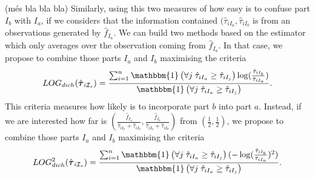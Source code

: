 \documentclass[10pt, a4paper]{article}
\newcommand{\m}[1]{\boldsymbol{#1}}
\begin{document}
{\color{red} (més bla bla bla)} Similarly, using this two measures of how easy is to confuse part $I_b$ with $I_a$, if we considers that the information contained $(\hat{\tau}_{iI_a}, \hat{\tau}_{iI_b}$ is from an observations generated by $\hat{f}_{I_a}$. We can build two methods based on the estimator which only averages over the observation coming from $\hat{f}_{I_a}$. In that case, we propose to combine those parts $I_a$ and $I_b$ maximising the criteria
\[
LOG_{dich}( \hat{\m \tau}_{i \mathcal{I}_s} ) = \frac{ \sum_{i=1}^n  \mathbbm{1}\left( \forall j\; \hat{\tau}_{i I_{a}} \geq \hat{\tau}_{iI_j} \right) \log (\frac{ \hat{\tau}_{iI_b} }{ \hat{\tau}_{iI_a} })}{\mathbbm{1}\left( \forall j\; \hat{\tau}_{i I_{a}} \geq \hat{\tau}_{iI_j} \right)}.
\]
This criteria measures how likely is to incorporate part $b$ into part $a$. Instead, if we are interested how far is $(\frac{\hat{f}_{I_a}}{\hat{\tau}_{iI_a} + \hat{\tau}_{iI_b}}, \frac{\hat{f}_{I_b}}{\hat{\tau}_{iI_a} + \hat{\tau}_{iI_b}})$ from $(\frac{1}{2}, \frac{1}{2})$, we propose to combine those parts $I_a$ and $I_b$ maximising the criteria
\[
LOG^2_{dich}( \hat{\m \tau}_{i \mathcal{I}_s} ) = \frac{ \sum_{i=1}^n \mathbbm{1}\left( \forall j\; \hat{\tau}_{i I_{a}} \geq \hat{\tau}_{iI_j} \right) (-\log (\frac{ \hat{\tau}_{iI_b} }{ \hat{\tau}_{iI_a} })^2)}{\mathbbm{1}\left( \forall j\; \hat{\tau}_{i I_{a}} \geq \hat{\tau}_{iI_j} \right)}.
\]

%
%


 
\end{document}
